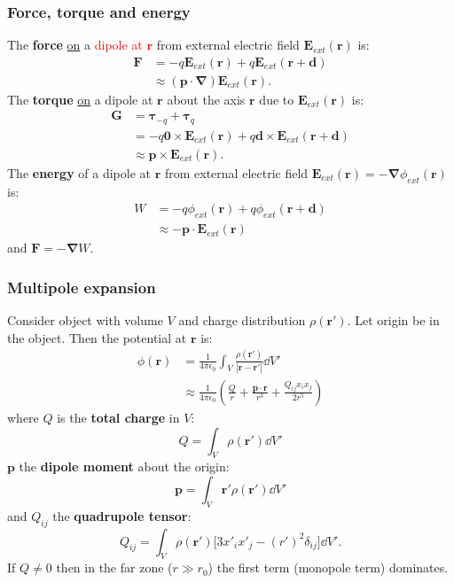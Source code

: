 \documentclass{article}
\newcommand{\vc}[1]{\boldsymbol{#1}}
\begin{document}
\begin{multicols*}{3}
\subsubsection*{Force, torque and energy}
The \textbf{force} \underline{on} a
\textcolor{red}{dipole at $\vc{r}$}
from external electric field $\vc{E}_{ext}(\vc{r})$ is:
\begin{align*}
    \vc{F}
    &=-q\vc{E}_{ext}(\vc{r})+q\vc{E}_{ext}(\vc{r}+\vc{d}) \\
    &\approx(\vc{p}\cdot\vc{\nabla})\vc{E}_{ext}(\vc{r}).
\end{align*}
The \textbf{torque} \underline{on} a dipole at $\vc{r}$
about the axis $\vc{r}$ due to $\vc{E}_{ext}(\vc{r})$ is:
\begin{align*}
    \vc{G}
    &=\vc{\tau}_{-q}+\vc{\tau}_{q} \\
    &=-q\vc{0}\times\vc{E}_{ext}(\vc{r})
    +q\vc{d}\times\vc{E}_{ext}(\vc{r}+\vc{d}) \\
    &\approx\vc{p}\times\vc{E}_{ext}(\vc{r}).
\end{align*}
The \textbf{energy} of a dipole at $\vc{r}$
from external electric field 
$\vc{E}_{ext}(\vc{r})=-\vc{\nabla}\phi_{ext}(\vc{r})$ is:
\begin{align*}
    W
    &=-q\phi_{ext}(\vc{r})+q\phi_{ext}(\vc{r}+\vc{d}) \\
    &\approx -\vc{p}\cdot\vc{E}_{ext}(\vc{r})
\end{align*}
and $\vc{F}=-\vc{\nabla}W$.

\subsubsection*{Multipole expansion}
Consider object with volume $V$ and charge distribution
$\rho(\vc{r}')$. Let origin be in the object.
Then the potential at $\vc{r}$ is:
\begin{align*}
    \phi(\vc{r})
    &=\frac{1}{4\pi\epsilon_0}\int_V
    \frac{\rho(\vc{r}')}{|\vc{r}-\vc{r}'|}\dd V' \\
    &\approx\frac{1}{4\pi\epsilon_0}\left(
    \frac{Q}{r}+\frac{\vc{p}\cdot\vc{r}}{r^3}
    +\frac{Q_{ij}x_i x_j}{2r^5}\right)
\end{align*}
where $Q$ is the \textbf{total charge} in $V$:
$$Q=\int_V\rho(\vc{r}')\dd V'$$
$\vc{p}$ the \textbf{dipole moment} about the origin:
$$\vc{p}=\int_V\vc{r}'\rho(\vc{r}')\dd V'$$
and $Q_{ij}$ the \textbf{quadrupole tensor}:
$$Q_{ij}=\int_V\rho(\vc{r}')
\bigg[3x'_i x'_j-(r')^2\delta_{ij}\bigg]\dd V'.$$
If $Q\neq0$ then in the far zone ($r\gg r_0$)
the first term (monopole term) dominates.


\end{multicols*}
\end{document}
